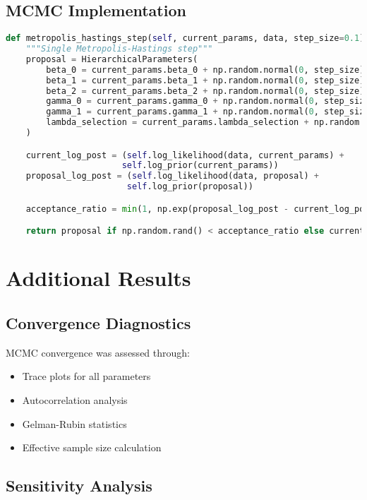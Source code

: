 \documentclass[11pt,a4paper]{article}
\begin{document}
\subsection{MCMC Implementation}

\begin{lstlisting}[language=Python, caption=MCMC Sampling]
def metropolis_hastings_step(self, current_params, data, step_size=0.1):
    """Single Metropolis-Hastings step"""
    proposal = HierarchicalParameters(
        beta_0 = current_params.beta_0 + np.random.normal(0, step_size),
        beta_1 = current_params.beta_1 + np.random.normal(0, step_size),
        beta_2 = current_params.beta_2 + np.random.normal(0, step_size),
        gamma_0 = current_params.gamma_0 + np.random.normal(0, step_size),
        gamma_1 = current_params.gamma_1 + np.random.normal(0, step_size),
        lambda_selection = current_params.lambda_selection + np.random.normal(0, step_size)
    )

    current_log_post = (self.log_likelihood(data, current_params) +
                       self.log_prior(current_params))
    proposal_log_post = (self.log_likelihood(data, proposal) +
                        self.log_prior(proposal))

    acceptance_ratio = min(1, np.exp(proposal_log_post - current_log_post))

    return proposal if np.random.rand() < acceptance_ratio else current_params
\end{lstlisting}

\section{Additional Results}
\label{app:results}

\subsection{Convergence Diagnostics}

MCMC convergence was assessed through:
\begin{itemize}
    \item Trace plots for all parameters
    \item Autocorrelation analysis
    \item Gelman-Rubin statistics
    \item Effective sample size calculation
\end{itemize}

\subsection{Sensitivity Analysis}
\end{document}
